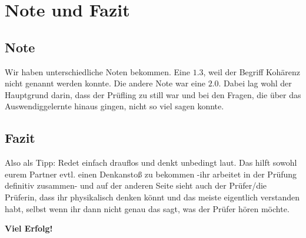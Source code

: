 \section{Note und Fazit}

\subsection{Note}

Wir haben unterschiedliche Noten bekommen. Eine $\num{1.3}$, weil der Begriff Kohärenz nicht genannt werden konnte. Die andere Note war eine $\num{2.0}$. 
Dabei lag wohl der Hauptgrund darin, dass der Prüfling zu still war und bei den Fragen, die über das Auswendiggelernte hinaus gingen, nicht so viel sagen konnte. 

\subsection{Fazit}
Also als Tipp: Redet einfach drauflos und denkt unbedingt laut. Das hilft sowohl eurem Partner evtl. einen Denkanstoß zu bekommen -ihr arbeitet in der Prüfung definitiv zusammen- und auf der anderen Seite sieht auch der Prüfer/die Prüferin, dass ihr physikalisch denken könnt und das meiste eigentlich verstanden habt, selbst wenn ihr dann nicht genau das sagt, was der Prüfer hören möchte.

\noindent \textbf{Viel Erfolg!} 
